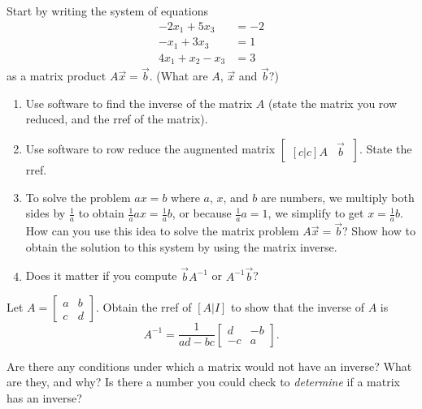\begin{problem}
Start by writing the system of equations 
\begin{align*}
 -2x_1+ 5x_3 &=-2\\
 -x_1+ 3x_3 &=1\\
 4x_1 +x_2  -x_3 &=3
\end{align*} 
as a matrix product $A\vec x =\vec b$.  (What are $A$, $\vec x$ and $\vec b$?)  
\begin{enumerate}
\item 
{}%
Use software to find the inverse of the matrix $A$ (state the matrix you row reduced, and the rref of the matrix). 
\item Use software to row reduce the augmented matrix $\begin{bmatrix}[c|c]A&\vec b \ \end{bmatrix}$. State the rref.
\item To solve the problem $ax=b$ where $a$, $x$, and $b$ are numbers, we multiply both sides by $\frac{1}{a}$ to obtain $\frac{1}{a}ax=\frac{1}{a}b$, or because $\frac{1}{a}a=1$, we simplify to get $x=\frac{1}{a}b$. How can you use this idea to solve the matrix problem $A\vec x = \vec b$?  Show how to obtain the solution to this system by using the matrix inverse. 
\item Does it matter if you compute $\vec b A^{-1}$ or  $A^{-1}\vec b$?
\end{enumerate}
\end{problem}



\begin{problem}\label{inverse of 2 by 2}
%
Let $A=\begin{bmatrix}a&b\\c&d\end{bmatrix}$. Obtain the rref of $[A | I]$ to show that the inverse of $A$ is 
$$A^{-1}=\frac{1}{ad-bc}\begin{bmatrix}d&-b\\-c&a\end{bmatrix}.$$

Are there any conditions under which a matrix would not have an inverse?  What are they, and why? Is there a number you could check to {\it determine} if a matrix has an inverse?
\end{problem}

